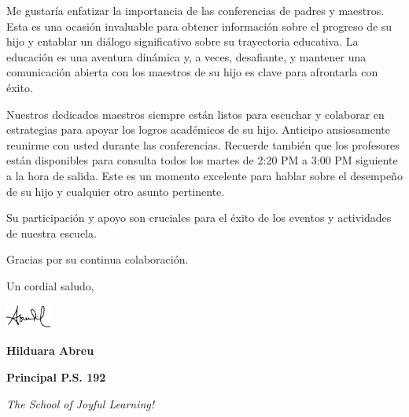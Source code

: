 \documentclass[12pt,letterpaper]{article}
\begin{document}
Me gustaría enfatizar la importancia de las conferencias de padres y maestros. Esta es una ocasión invaluable para obtener información sobre el progreso de su hijo y entablar un diálogo significativo sobre su trayectoria educativa. La educación es una aventura dinámica y, a veces, desafiante, y mantener una comunicación abierta con los maestros de su hijo es clave para afrontarla con éxito.

Nuestros dedicados maestros siempre están listos para escuchar y colaborar en estrategias para apoyar los logros académicos de su hijo. Anticipo ansiosamente reunirme con usted durante las conferencias.
Recuerde también que los profesores están disponibles para consulta todos los martes de 2:20 PM  a 3:00 PM siguiente a la hora de salida. Este es un momento excelente para hablar sobre el desempeño de su hijo y cualquier otro asunto pertinente.

Su participación y apoyo son cruciales para el éxito de los eventos y actividades de nuestra escuela.

Gracias por su continua colaboración.

Un cordial saludo,

\includegraphics[width=0.12\textwidth]{hil_signature}

\textbf{Hilduara Abreu}

\textbf{Principal P.S. 192}

\textit{The School of Joyful Learning!}
\end{document}
